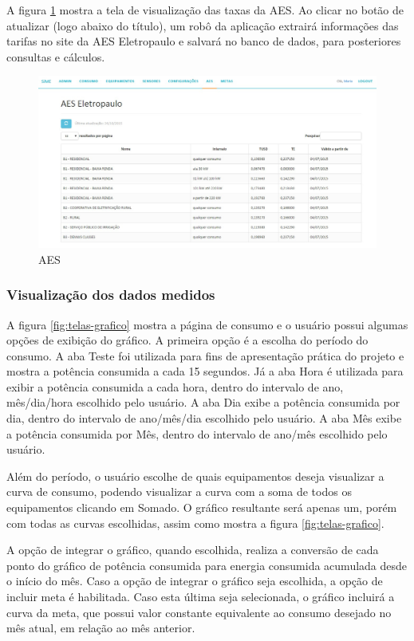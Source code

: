 A figura \ref{fig:telas-aes} mostra a tela de visualização das taxas da AES. Ao clicar no botão de atualizar (logo abaixo do título), um robô da aplicação extrairá informações das tarifas no site da AES Eletropaulo e salvará no banco de dados, para posteriores consultas e cálculos. 

\begin{figure}[H]
\centering
\includegraphics[width=1\textwidth]{figuras/aes.jpg}
\caption{\label{fig:telas-aes} AES}
\end{figure}

\subsubsection{Visualização dos dados medidos}

A figura \ref{fig:telas-grafico} mostra a página de consumo e o usuário possui algumas opções de exibição do gráfico. A primeira opção é a escolha do período do consumo. A aba Teste foi utilizada para fins de apresentação prática do projeto e mostra a potência consumida a cada 15 segundos. Já a aba Hora é utilizada para exibir a potência consumida a cada hora, dentro do intervalo de ano, mês/dia/hora escolhido pelo usuário. A aba Dia exibe a potência consumida por dia, dentro do intervalo de ano/mês/dia escolhido pelo usuário. A aba Mês exibe a potência consumida por Mês, dentro do intervalo de ano/mês escolhido pelo usuário.

Além do período, o usuário escolhe de quais equipamentos deseja visualizar a curva de consumo, podendo visualizar a curva com a soma de todos os equipamentos clicando em Somado. O gráfico resultante será apenas um, porém com todas as curvas escolhidas, assim como mostra a figura \ref{fig:telas-grafico}.  

A opção de integrar o gráfico, quando escolhida, realiza a conversão de cada ponto do gráfico de potência consumida para energia consumida acumulada desde o início do mês. Caso a opção de integrar o gráfico seja escolhida, a opção de incluir meta é habilitada. Caso esta última seja selecionada, o gráfico incluirá a curva da meta, que possui valor constante equivalente ao consumo desejado no mês atual, em relação ao mês anterior.

